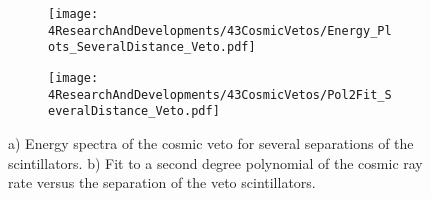 \begin{figure}
\centering
    \begin{subfigure}[b]{1\textwidth}
    \centering
    \texttt{[image: 4ResearchAndDevelopments/43CosmicVetos/Energy\_Plots\_SeveralDistance\_Veto.pdf]}  
    \caption{\label{subfig:EnergySpectrumsSeveralDistanceVeto}}
    \end{subfigure}
    \hfill
    \begin{subfigure}[b]{1\textwidth}
    \centering
    \texttt{[image: 4ResearchAndDevelopments/43CosmicVetos/Pol2Fit\_SeveralDistance\_Veto.pdf]}  
    \caption{\label{subfig:LinearFitSeveralDistanceVeto}}
    \end{subfigure}
 \caption{a) Energy spectra of the cosmic veto for several separations of the scintillators. b) Fit to a second degree polynomial of the cosmic ray rate versus the separation of the veto scintillators.}
 \label{fig:DistanceVeto}
\end{figure}

